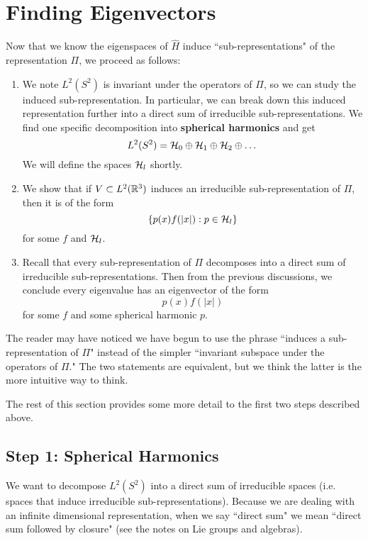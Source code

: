\section{Finding Eigenvectors}
Now that we know the eigenspaces of $\hat{H}$ induce ``sub-representations" of the representation $\Pi$, we proceed as follows:
\begin{enumerate}
    \item We note $L^2(S^2)$ is invariant under the operators of $\Pi$, so we can study the induced sub-representation. In particular, we can break down this induced representation further into a direct sum of irreducible sub-representations. We find one specific decomposition into \textbf{spherical harmonics} and get
        \[
            L^2(S^2) = {\mathcal H}_0 \oplus {\mathcal H}_1 \oplus {\mathcal H}_2 \oplus \dots
        \]
        We will define the spaces ${\mathcal H}_l$ shortly.

    \item We show that if $V \subset L^2({\mathbb R}^3)$ induces an irreducible sub-representation of $\Pi$, then it is of the form
        \[
            \{p(x)f(|x|): p \in {\mathcal H}_l\}
        \]
        for some $f$ and ${\mathcal H}_l$.

    \item Recall that every sub-representation of $\Pi$ decomposes into a direct sum of irreducible sub-representations. Then from the previous discussions, we conclude every eigenvalue has an eigenvector of the form
        \[
            p(x)f(|x|)
        \]
        for some $f$ and some spherical harmonic $p$.
\end{enumerate}
The reader may have noticed we have begun to use the phrase ``induces a sub-representation of $\Pi$" instead of the simpler ``invariant subspace under the operators of $\Pi$." The two statements are equivalent, but we think the latter is the more intuitive way to think.

The rest of this section provides some more detail to the first two steps described above.

\subsection{Step 1: Spherical Harmonics}
We want to decompose $L^2(S^2)$ into a direct sum of irreducible spaces (i.e. spaces that induce irreducible sub-representations). Because we are dealing with an infinite dimensional representation, when we say ``direct sum" we mean ``direct sum followed by closure" (see the notes on Lie groups and algebras).

